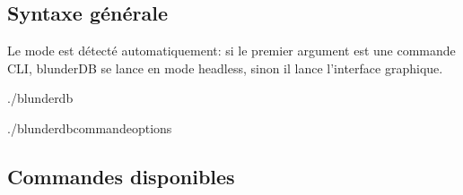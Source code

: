 \documentclass[letterpaper,10pt,french]{sphinxmanual}
\begin{document}
\subsection{Syntaxe générale}
\label{\detokenize{cli:syntaxe-generale}}
\sphinxAtStartPar
Le mode est détecté automatiquement: si le premier argument est une commande
CLI, blunderDB se lance en mode headless, sinon il lance l’interface graphique.

\begin{sphinxVerbatim}[commandchars=\\\{\}]
./blunderdb

./blunderdb\PYGZlt{}commande\PYGZgt{}\PYG{o}{[}options\PYG{o}{]}
\end{sphinxVerbatim}


\subsection{Commandes disponibles}
\label{\detokenize{cli:commandes-disponibles}}
\end{document}
